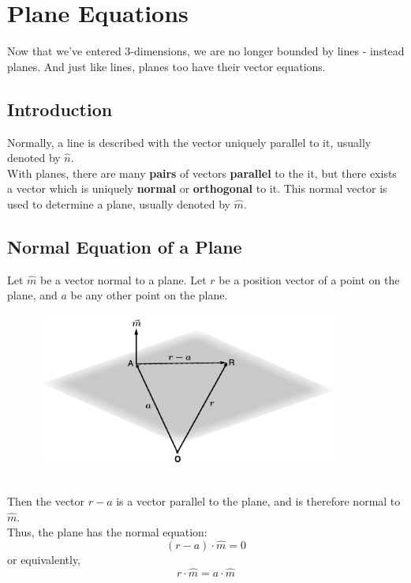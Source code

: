 \documentclass[hidelinks, a4paper, 12pt]{article}
\newcommand{\bd}{\textbf}
\newcommand{\nhat}{\hat{n}}
\newcommand{\mhat}{\hat{m}}
\newcommand{\n}{\\[\baselineskip]}
\begin{document}
    \section{Plane Equations}
        Now that we've entered 3-dimensions, we are no longer bounded by lines - instead planes. And just like lines, planes too have their vector equations.
        \subsection{Introduction}
            Normally, a line is described with the vector uniquely parallel to it, usually denoted by $\nhat$.\n
            With planes, there are many \bd{pairs} of vectors \bd{parallel} to the it, but there exists a vector which is uniquely \bd{normal} or \bd{orthogonal} to it.
            This normal vector is used to determine a plane, usually denoted by $\mhat$.
        
        \subsection{Normal Equation of a Plane}
            Let $\mhat$ be a vector normal to a plane. Let $r$ be a position vector of a point on the plane, and $a$ be any other point on the plane.
            \begin{figure}[ht]
                \centering
                \includegraphics[width=10cm, height=5cm]{normal-equation}       
            \end{figure}\\
            Then the vector $r-a$ is a vector parallel to the plane, and is therefore normal to $\mhat$.\\
            Thus, the plane has the normal equation:
            \[(r-a) \cdot \mhat = 0\]
            or equivalently,
            \begin{equation}
                r \cdot \mhat = a \cdot \mhat
            \end{equation}  
            
\end{document}
